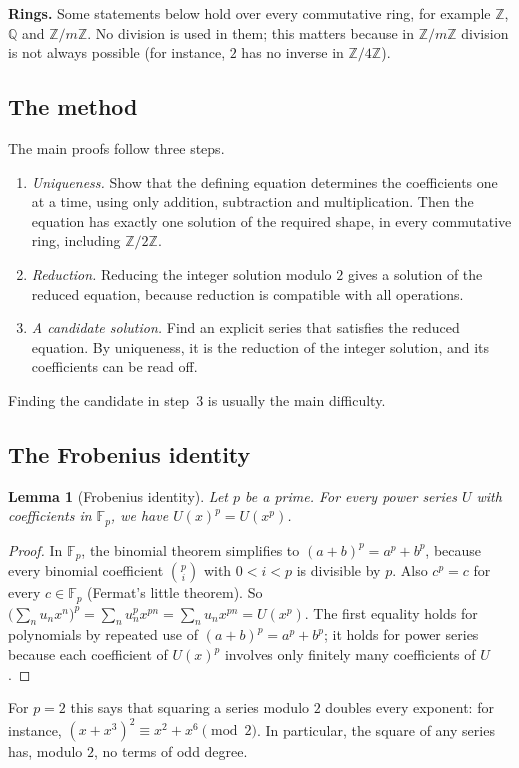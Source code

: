 \documentclass[11pt,a4paper]{article}
\newtheorem{lemma}[theorem]{Lemma}
\theoremstyle{definition}
\theoremstyle{remark}
\newcommand{\Z}{\mathbb{Z}}
\newcommand{\Q}{\mathbb{Q}}
\newcommand{\F}{\mathbb{F}}
\newcommand{\para}[1]{\par\medskip\noindent\textbf{#1}\enspace}
\begin{document}
\para{Rings.} Some statements below hold over every commutative ring, for example $\Z$, $\Q$ and $\Z/m\Z$. No
division is used in them; this matters because in $\Z/m\Z$ division is not always possible (for instance, $2$ has no inverse in
$\Z/4\Z$).

\subsection{The method}
The main proofs follow three steps.
\begin{enumerate}
\item \emph{Uniqueness.} Show that the defining equation determines the coefficients one at a time, using only
addition, subtraction and multiplication. Then the equation has exactly one solution of the required shape, in every
commutative ring, including $\Z/2\Z$.
\item \emph{Reduction.} Reducing the integer solution modulo $2$ gives a solution of the reduced equation,
because reduction is compatible with all operations.
\item \emph{A candidate solution.} Find an explicit series that satisfies the reduced equation. By uniqueness, it is
the reduction of the integer solution, and its coefficients can be read off.
\end{enumerate}
Finding the candidate in step~3 is usually the main difficulty.
\subsection{The Frobenius identity}
\begin{lemma}[Frobenius identity]\label{lem:frobenius}
Let $p$ be a prime. For every power series $U$ with coefficients in $\F_p$, we have $U(x)^p=U(x^p)$.
\end{lemma}

\begin{proof}
In $\F_p$, the binomial theorem simplifies to $(a+b)^p=a^p+b^p$, because every binomial coefficient
$\binom pi$ with $0<i<p$ is divisible by $p$. Also $c^p=c$ for every $c\in\F_p$ (Fermat's little theorem). So
$\bigl(\sum_nu_nx^n\bigr)^p=\sum_nu_n^px^{pn}=\sum_nu_nx^{pn}=U(x^p)$. The first equality holds for polynomials by
repeated use of $(a+b)^p=a^p+b^p$; it holds for power series because each coefficient of $U(x)^p$ involves only finitely
many coefficients of $U$.
\end{proof}

For $p=2$ this says that squaring a series modulo $2$ doubles every exponent: for instance,
$(x+x^3)^2\equiv x^2+x^6\pmod2$. In particular, the square of any series has, modulo $2$, no terms of odd degree.
\end{document}
